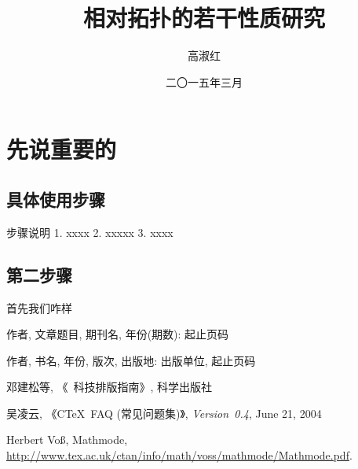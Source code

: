 \documentclass[forlib]{HNUthesis}   %
\begin{document}

\title{相对拓扑的若干性质研究}               %
\author{高淑红}                             %
\date{二〇一五年三月}                       %

\maketitle


\tableofcontents
\thispagestyle{empty}

\frontmatter  %

\mainmatter   %

\baselineskip=21pt  %

\chapter{先说重要的}

\section{具体使用步骤}

步骤说明
1. xxxx
2. xxxxx
3. xxxx

\section{第二步骤}

首先我们咋样

\cleardoublepage{}
{}
\begin{thebibliography}{000}

   作者, 文章题目, 期刊名, 年份(期数): 起止页码

   作者, 书名, 年份, 版次, 出版地: 出版单位, 起止页码

   邓建松等, 《\LaTeXe~科技排版指南》, 科学出版社

   吴凌云, 《CTeX~FAQ (常见问题集)》, \textit{Version~0.4}, June 21, 2004

   Herbert Vo\ss, Mathmode, \url{http://www.tex.ac.uk/ctan/info/math/voss/mathmode/Mathmode.pdf}.

\end{thebibliography}



\backmatter

\cleardoublepage
\end{document}
